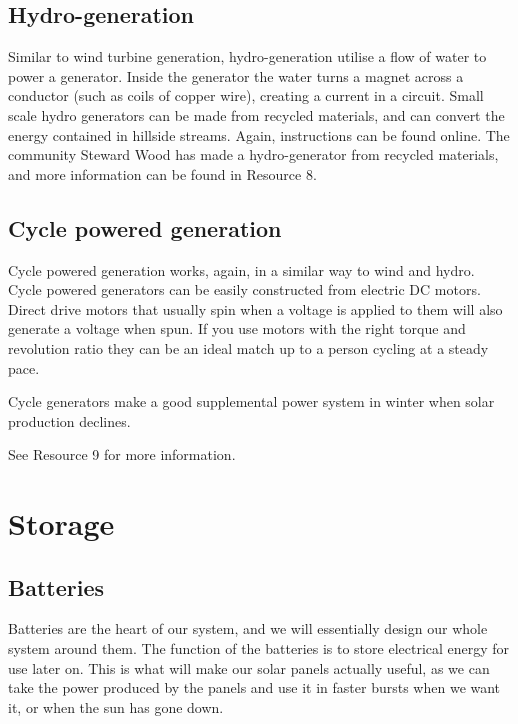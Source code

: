 \documentclass{article}
\theoremstyle{definition}
\theoremstyle{definition}
\theoremstyle{remark}
\begin{document}
  \subsection{Hydro-generation} %
  \label{sub:hydro_generation}

    Similar to wind turbine generation, hydro-generation utilise a flow of water to power a generator. Inside the generator the water turns a magnet across a conductor (such as coils of copper wire), creating a current in a circuit. Small scale hydro generators can be made from recycled materials, and can convert the energy contained in hillside streams. Again, instructions can be found online. The community Steward Wood has made a hydro-generator from recycled materials, and more information can be found in Resource 8.
  

  \subsection{Cycle powered generation} %
  \label{sub:cycle_powered_generation}

    Cycle powered generation works, again, in a similar way to wind and hydro. Cycle powered generators can be easily constructed from electric DC motors. Direct drive motors that usually spin when a voltage is applied to them will also generate a voltage when spun. If you use motors with the right torque and revolution ratio they can be an ideal match up to a person cycling at a steady pace.

    Cycle generators make a good supplemental power system in winter when solar production declines.

    See Resource 9 for more information.
  


\section{Storage} %
\label{sec:storage}

  \subsection{Batteries} %
  \label{sub:batteries}

    Batteries are the heart of our system, and we will essentially design our whole system around them. The function of the batteries is to store electrical energy for use later on. This is what will make our solar panels actually useful, as we can take the power produced by the panels and use it in faster bursts when we want it, or when the sun has gone down. 
\end{document}
